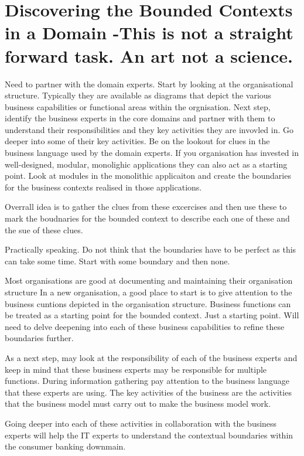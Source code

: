 \section{Discovering the Bounded Contexts in a Domain -This is not a straight forward task. An art not a science.}

Need to partner with the domain experts.
Start by looking at the organisational structure.
Typically they are available as diagrams that depict the various business capabilities or functional areas within the orgnisation.
Next step, identify the business experts in the core domains and partner with them to understand their responsibilities and they key activities they are invovled in.
Go deeper into some of their key activities.
Be on the lookout for clues in the business language used by the domain experts.
If you organisation has invested in well-designed, modular, monolighic applications they can also act as a starting point.
Look at modules in the monolithic applicaiton and create the boundaries for the business contexts realised in those applications.

Overrall idea is to gather the clues from these excercises and then use these to mark the boudnaries for the bounded context to describe each one of these and the sue of these clues.

Practically speaking. Do not think that the boundaries have to be perfect as this can take some time.
Start with some boundary and then none.

Most organisations are good at documenting and maintaining their organisation structure
In a new organisation, a good place to start is to give attention to the business cuntions depicted in the organisation structure.
Business functions can be treated as a starting point for the bounded context.
Just a starting point.
Will need to delve deepening into each of these business capabilities to refine these boundaries further.

As a next step, may look at the responsibility of each of the business experts and keep in mind that these business experts may be responsible for multiple functions.
During information gathering pay attention to the business language that these experts are using.
The key activities of the business are the activities that the business model must carry out to make the business model work.

Going deeper into each of these activities in collaboration with the business experts will help the IT experts to understand the contextual boundaries within the consumer banking downmain.

